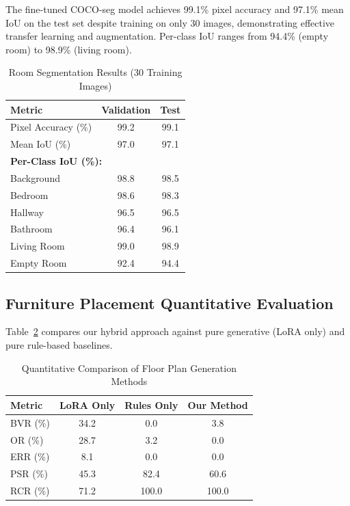 \documentclass[10pt,conference]{IEEEtran}
\begin{document}
The fine-tuned COCO-seg model achieves 99.1\% pixel accuracy and 97.1\% mean IoU on the test set despite training on only 30 images, demonstrating effective transfer learning and augmentation. Per-class IoU ranges from 94.4\% (empty room) to 98.9\% (living room).
\begin{table}[htbp]
\caption{Room Segmentation Results (30 Training Images)}
\begin{center}
\begin{tabular}{|l|c|c|}
\hline
\textbf{Metric} & \textbf{Validation} & \textbf{Test} \\
\hline
Pixel Accuracy (\%) & 99.2 & 99.1 \\
Mean IoU (\%) & 97.0 & 97.1 \\
\hline
\multicolumn{3}{|l|}{\textbf{Per-Class IoU (\%):}} \\
\hline
Background & 98.8 & 98.5 \\
Bedroom & 98.6 & 98.3 \\
Hallway & 96.5 & 96.5 \\
Bathroom & 96.4 & 96.1 \\
Living Room & 99.0 & 98.9 \\
Empty Room & 92.4 & 94.4 \\
\hline
\end{tabular}
\label{tab:segmentation}
\end{center}
\end{table}

\subsection{Furniture Placement Quantitative Evaluation}

Table~\ref{tab:results} compares our hybrid approach against pure generative (LoRA only) and pure rule-based baselines.

\begin{table}[htbp]
\caption{Quantitative Comparison of Floor Plan Generation Methods}
\begin{center}
\begin{tabular}{|l|c|c|c|}
\hline
\textbf{Metric} & \textbf{LoRA Only} & \textbf{Rules Only} & \textbf{Our Method} \\
\hline
BVR (\%) & 34.2 & 0.0 & 3.8 \\
OR (\%) & 28.7 & 3.2 & 0.0 \\
ERR (\%) & 8.1 & 0.0 & 0.0 \\
PSR (\%) & 45.3 & 82.4 & 60.6 \\
RCR (\%) & 71.2 & 100.0 & 100.0 \\
\hline
\end{tabular}
\label{tab:results}
\end{center}
\end{table}
\end{document}
